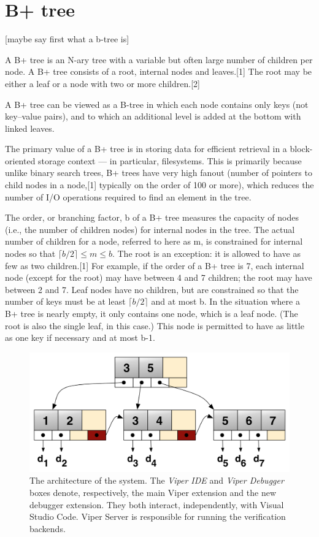 \section{B+ tree}\label{sec:B+tree}
[maybe say first what a b-tree is]

A B+ tree is an N-ary tree with a variable but often large number of children per node. A B+ tree consists of a root, internal nodes and leaves.[1] The root may be either a leaf or a node with two or more children.[2]

A B+ tree can be viewed as a B-tree in which each node contains only keys (not key–value pairs), and to which an additional level is added at the bottom with linked leaves.

The primary value of a B+ tree is in storing data for efficient retrieval in a block-oriented storage context — in particular, filesystems. This is primarily because unlike binary search trees, B+ trees have very high fanout (number of pointers to child nodes in a node,[1] typically on the order of 100 or more), which reduces the number of I/O operations required to find an element in the tree.

The order, or branching factor, b of a B+ tree measures the capacity of nodes (i.e., the number of children nodes) for internal nodes in the tree. The actual number of children for a node, referred to here as m, is constrained for internal nodes so that $\lceil b/2\rceil \leq m\leq b$. The root is an exception: it is allowed to have as few as two children.[1] For example, if the order of a B+ tree is 7, each internal node (except for the root) may have between 4 and 7 children; the root may have between 2 and 7. Leaf nodes have no children, but are constrained so that the number of keys must be at least $\lceil b/2 \rceil$  and at most b. In the situation where a B+ tree is nearly empty, it only contains one node, which is a leaf node. (The root is also the single leaf, in this case.) This node is permitted to have as little as one key if necessary and at most b-1.

\begin{figure}[htb]
    \centering
    \includegraphics{img/b+tree.png}
    \caption[The architecture of the system]{ The architecture of the system. The
      \textit{Viper IDE} and \textit{Viper Debugger} boxes denote, respectively,
      the main Viper extension and the new debugger extension. They both interact,
      independently, with Visual Studio Code. Viper Server is responsible for
      running the verification backends.}
    \label{fig:b+tree}
\end{figure}

